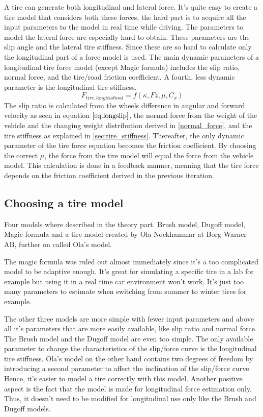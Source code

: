 A tire can generate both longitudinal and lateral force. It's quite easy to create a tire model that considers both these forces, the hard part is to acquire all the input parameters to the model in real time while driving. The parameters to model the lateral force are especially hard to obtain. These parameters are the slip angle and the lateral tire stiffness. Since these are so hard to calculate only the longitudinal part of a force model is used. The main dynamic parameters of a longitudinal tire force model (except Magic formula) includes the slip ratio, normal force, and the tire/road friction coefficient. A fourth, less dynamic parameter is the longitudinal tire stiffness. 
\begin{equation}
F_{tire, longitudinal} = f(\kappa, Fz, \mu, C_{x})
\end{equation}
The slip ratio is calculated from the wheels difference in angular and forward velocity as seen in equation $ \ref{eq:longslip} $, the normal force from the weight of the vehicle and the changing weight distribution derived in \ref{normal_force}, and the tire stiffness as explained in \ref{sec:tire_stiffness}. Thereafter, the only dynamic parameter of the tire force equation becomes the friction coefficient. By choosing the correct $ \mu $, the force from the tire model will equal the force from the vehicle model. This calculation is done in a feedback manner, meaning that the tire force depends on the friction coefficient derived in the previous iteration.

\subsection{Choosing a tire model}
Four models where described in the theory part. Brush model, Dugoff model, Magic formula and a tire model created by Ola Nockhammar at Borg Warner AB, further on called Ola's model.

The magic formula was ruled out almost immediately since it's a too complicated model to be adaptive enough. It's great for simulating a specific tire in a lab for example but using it in a real time car environment won't work. It's just too many parameters to estimate when switching from summer to winter tires for example. 

The other three models are more simple with fewer input parameters and above all it's parameters that are more easily available, like slip ratio and normal force. The Brush model and the Dugoff model are even too simple. The only available parameter to change the characteristics of the slip/force curve is the longitudinal tire stiffness. Ola's model on the other hand contains two degrees of freedom by introducing a second parameter to affect the inclination of the slip/force curve. Hence, it's easier to model a tire correctly with this model. Another positive aspect is the fact that the model is made for longitudinal force estimation only. Thus, it doesn't need to be modified for longitudinal use only like the Brush and Dugoff models. 

